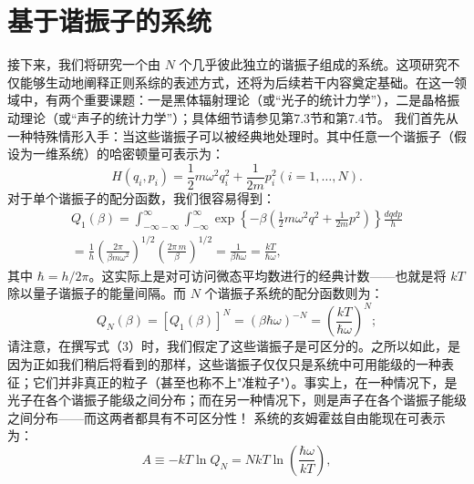 \section{基于谐振子的系统}\label{ux57faux4e8eux8c10ux632fux5b50ux7684ux7cfbux7edf}
接下来，我们将研究一个由 \(N\) 个几乎彼此独立的谐振子组成的系统。这项研究不仅能够生动地阐释正则系综的表述方式，还将为后续若干内容奠定基础。在这一领域中，有两个重要课题：一是黑体辐射理论（或“光子的统计力学”），二是晶格振动理论（或“声子的统计力学”）；具体细节请参见第7.3节和第7.4节。
我们首先从一种特殊情形入手：当这些谐振子可以被经典地处理时。其中任意一个谐振子（假设为一维系统）的哈密顿量可表示为：
\begin{equation}\tag{3.5.52}\label{eq:3.5.52}
H ( q _ { i } , p _ { i } ) = \frac { 1 } { 2 } m \omega ^{2} q _ { i } ^{2} + \frac { 1 } { 2 m } p _ { i } ^{2}  ( i = 1 , \ldots , N ) .
\end{equation}
对于单个谐振子的配分函数，我们很容易得到：
\begin{equation}\tag{3.5.53}\label{eq:3.5.53}
\begin{array}{r} { Q _ { 1 } ( \beta ) = \displaystyle \int _ { - \infty - \infty } ^{\infty} \displaystyle \int _ { - \infty } ^{\infty} \exp \left\{ - \beta \left( \frac { 1 } { 2 } m \omega ^{2} q ^{2} + \frac { 1 } { 2 m } p ^{2} \right) \right\} \frac { d q d p } { h } } \\{ = \displaystyle \frac { 1 } { h } \left( \frac { 2 \pi } { \beta m \omega ^{2} } \right) ^{1 / 2} \left( \frac { 2 \pi \, m } { \beta } \right) ^{1 / 2} = \displaystyle \frac { 1 } { \beta \hbar \omega } = \displaystyle \frac { k T } { \hbar \omega } , } \end{array}
\end{equation}
其中 \(\hbar = h/2\pi\)。这实际上是对可访问微态平均数进行的经典计数——也就是将 \(kT\) 除以量子谐振子的能量间隔。而 \(N\) 个谐振子系统的配分函数则为：
\begin{equation}\tag{3.5.54}\label{eq:3.5.54}
Q _ { N } ( \beta ) = [ Q _ { 1 } ( \beta ) ] ^{N} = ( \beta \hbar \omega ) ^{- N} = \left( \frac { k T } { \hbar \omega } \right) ^{N} ;
\end{equation}
请注意，在撰写式（3）时，我们假定了这些谐振子是可区分的。之所以如此，是因为正如我们稍后将看到的那样，这些谐振子仅仅只是系统中可用能级的一种表征；它们并非真正的粒子（甚至也称不上"准粒子"）。事实上，在一种情况下，是光子在各个谐振子能级之间分布；而在另一种情况下，则是声子在各个谐振子能级之间分布——而这两者都具有不可区分性！
系统的亥姆霍兹自由能现在可表示为：
\begin{equation}\tag{3.5.55}\label{eq:3.5.55}
A \equiv - k T \ln Q _ { N } = N k T \ln \left( \frac { \hbar \omega } { k T } \right) ,
\end{equation}
